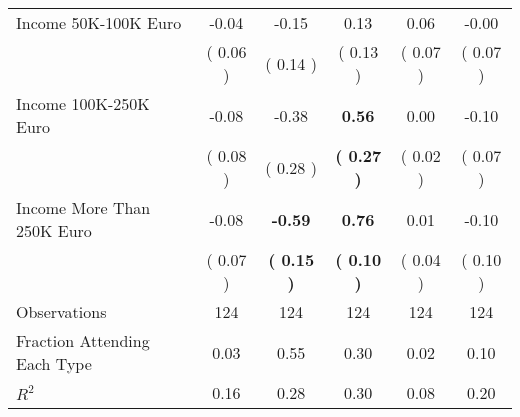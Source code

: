 \begin{table}[H]
{\begin{tabular}{lccccc}
\quad Income 50K-100K Euro &     -0.04 &     -0.15 &      0.13 &      0.06 &     -0.00 \\
\quad  & (     0.06 ) & (     0.14 )  & (     0.13 )  & (     0.07 ) & (     0.07 ) \\
\quad Income 100K-250K Euro &     -0.08 &     -0.38 & \textbf{     0.56} &      0.00 &     -0.10 \\
\quad  & (     0.08 ) & (     0.28 )  & \textbf{(     0.27 )}  & (     0.02 ) & (     0.07 ) \\
\quad Income More Than 250K Euro &     -0.08 & \textbf{    -0.59} & \textbf{     0.76} &      0.01 &     -0.10 \\
\quad  & (     0.07 ) & \textbf{(     0.15 )}  & \textbf{(     0.10 )}  & (     0.04 ) & (     0.10 ) \\
\midrule
Observations & 124 & 124 & 124 & 124 & 124 \\
Fraction Attending Each Type &      0.03 &      0.55 &      0.30 &      0.02 &      0.10 \\
\midrule
$ R^2$ &      0.16 &      0.28 &      0.30 &      0.08 &      0.20 \\
\bottomrule
\end{tabular}}
\end{table}

